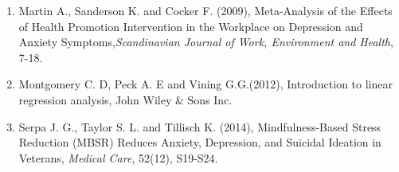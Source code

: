 \documentclass[11pt]{article}\usepackage[]{graphicx}\usepackage[]{xcolor}
\numberwithin{equation}{section}
\numberwithin{table}{section}
\begin{document}
\begin{enumerate}
	\item Martin A., Sanderson K. and Cocker F. (2009), Meta-Analysis of the Effects of Health Promotion Intervention in the Workplace on Depression and Anxiety Symptoms,\emph{Scandinavian Journal of Work, Environment and Health}, 7-18.
	\item  Montgomery C. D, Peck A. E and Vining G.G.(2012), Introduction to linear regression analysis, John Wiley \& Sons Inc.
	\item Serpa J. G., Taylor S. L. and Tillisch K. (2014), Mindfulness-Based Stress Reduction (MBSR) Reduces Anxiety, Depression, and Suicidal Ideation in Veterans, \emph{Medical Care}, 52(12), S19-S24.
\end{enumerate}
\end{document}
